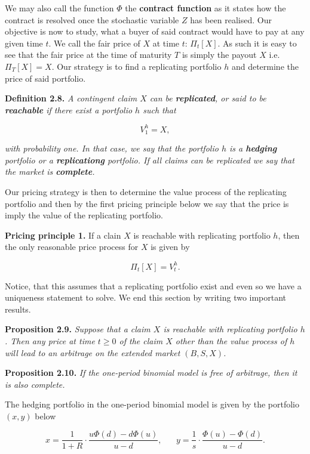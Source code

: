 \documentclass[
]{article}
\begin{document}
We may also call the function \(\Phi\) the \textbf{contract function} as
it states how the contract is resolved once the stochastic variable
\(Z\) has been realised. Our objective is now to study, what a buyer of
said contract would have to pay at any given time \(t\). We call the
fair price of \(X\) at time \(t\): \(\Pi_t[X]\). As such it is easy to
see that the fair price at the time of maturity \(T\) is simply the
payout \(X\) i.e.~\(\Pi_T[X]=X\). Our strategy is to find a replicating
portfolio \(h\) and determine the price of said portfolio.

\textbf{Definition 2.8.} \emph{A contingent claim \(X\) can be
\textbf{replicated}, or said to be \textbf{reachable} if there exist a
portfolio \(h\) such that}

\[
V_1^h=X,
\]

\emph{with probability one. In that case, we say that the portfolio
\(h\) is a \textbf{hedging} portfolio or a \textbf{replicationg}
portfolio. If all claims can be replicated we say that the market is
\textbf{complete}.}

Our pricing strategy is then to determine the value process of the
replicating portfolio and then by the first pricing principle below we
say that the price is imply the value of the replicating portfolio.

\textbf{Pricing principle 1.} If a clain \(X\) is reachable with
replicating portfolio \(h\), then the only reasonable price process for
\(X\) is given by

\[
\Pi_t[X]=V_t^h.
\]

Notice, that this assumes that a replicating portfolio exist and even so
we have a uniqueness statement to solve. We end this section by writing
two important results.

\textbf{Proposition 2.9.} \emph{Suppose that a claim \(X\) is reachable
with replicating portfolio \(h\). Then any price at time \(t\ge 0\) of
the claim \(X\) other than the value process of \(h\) will lead to an
arbitrage on the extended market \((B,S,X)\).}

\textbf{Proposition 2.10.} \emph{If the one-period binomial model is
free of arbitrage, then it is also complete.}

The hedging portfolio in the one-period binomial model is given by the
portfolio \((x,y)\) below

\[
x=\frac{1}{1+R}\cdot\frac{u\Phi(d)-d\Phi(u)}{u-d},\hspace{20pt}y=\frac{1}{s}\cdot\frac{\Phi(u)-\Phi(d)}{u-d}.
\]
\end{document}
